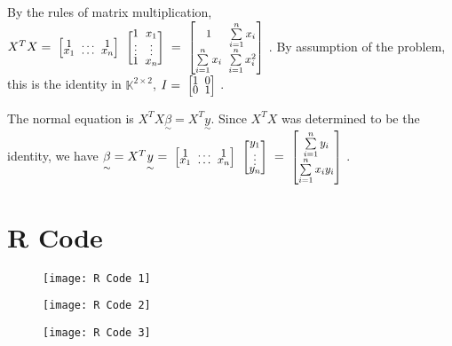 \documentclass[12pt, letterpaper]{article}
\theoremstyle{definition}
\numberwithin{equation}{section}
\newcommand{\mymatrix}[1]{
	\renewcommand{\arraystretch}{0.5} 
	\setlength\arraycolsep{3pt}       
	\scalebox{0.90}{                  
		$\begin{bmatrix}
			#1
		\end{bmatrix}$
	}                   
	\renewcommand{\arraystretch}{1.0} 
	\setlength\arraycolsep{6pt}       
}
\newcommand{\+}[1]{+_{\scalebox{.375}{#1}}}
\newcommand{\K}{\mathbb{K}}
\newcommand{\1}{\mathbbm{1}}
\begin{document}
\vspace{\baselineskip}
\noindent\textbf{}
\vspace{\baselineskip}

By the rules of matrix multiplication, $X^TX=\mymatrix{1 & \dots &1\\x_1 & \dots &x_n}\mymatrix{1&x_1\\\vdots &\vdots \\ 1 &x_n}=\mymatrix{1 & \sum\limits_{i=1}^{n}x_i\\\sum\limits_{i=1}^{n}x_i &\sum\limits_{i=1}^{n}x_i^2}$. By assumption of the problem, this is the identity in $\K ^{2\times 2}$, $I=\mymatrix{1&0\\0&1}$.
\vspace{\baselineskip}

The normal equation is $X^TX \underset{\sim}{\beta}=X^T\underset{\sim}{y}$. Since $X^TX$ was determined to be the identity, we have $\underset{\sim}{\beta}=X^T\underset{\sim}{y}=\mymatrix{1 & \dots &1\\x_1 & \dots &x_n}\mymatrix{y_1 \\ \vdots \\ y_n}=\mymatrix{\sum\limits_{i=1}^{n}y_i\\\sum\limits_{i=1}^{n}x_iy_i}$. 


\newpage
\section*{R Code}

\begin{figure}[H]
	\centering
	\texttt{[image: R Code 1]}
\end{figure}
\begin{figure}[H]
	\centering
	\texttt{[image: R Code 2]}
\end{figure}
\begin{figure}[H]
	\centering
	\texttt{[image: R Code 3]}
\end{figure}
\end{document}
